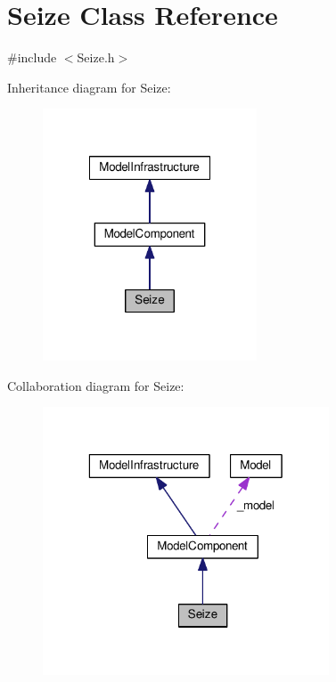 \hypertarget{class_seize}{\section{Seize Class Reference}
\label{class_seize}
}


{\ttfamily \#include $<$Seize.\-h$>$}



Inheritance diagram for Seize\-:\nopagebreak
\begin{figure}[H]
\begin{center}
\leavevmode
\includegraphics[width=180pt]{class_seize__inherit__graph}
\end{center}
\end{figure}


Collaboration diagram for Seize\-:\nopagebreak
\begin{figure}[H]
\begin{center}
\leavevmode
\includegraphics[width=241pt]{class_seize__coll__graph}
\end{center}
\end{figure}
